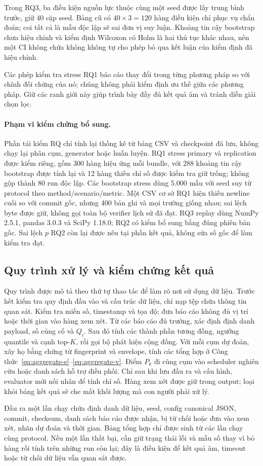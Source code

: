 Trong RQ3, ba điều kiện nguồn lực thuộc cùng một seed được lấy trung bình trước, giữ 40 cặp seed. Bảng cũ có $40\times3=120$ hàng điều kiện chỉ phục vụ chẩn đoán; coi tất cả là mẫu độc lập sẽ sai đơn vị suy luận. Khoảng tin cậy bootstrap chưa hiệu chỉnh và kiểm định Wilcoxon có Holm là hai thủ tục khác nhau, nên một CI không chứa không không tự cho phép bỏ qua kết luận của kiểm định đã hiệu chỉnh.

Các phép kiểm tra stress RQ1 báo cáo thay đổi trong từng phương pháp so với chính đối chứng của nó; chúng không phải kiểm định ưu thế giữa các phương pháp. Giữ các ranh giới này giúp trình bày đầy đủ kết quả âm và tránh diễn giải chọn lọc.

\paragraph{Phạm vi kiểm chứng bổ sung.} Phần tái kiểm RQ chỉ tính lại thống kê từ bảng CSV và checkpoint đã lưu, không chạy lại phân cụm, generator hoặc huấn luyện. RQ1 stress primary và replication được kiểm riêng, gồm 300 hàng hiệu ứng mỗi bundle, với 288 khoảng tin cậy bootstrap được tính lại và 12 hàng thiếu chỉ số được kiểm tra giữ trống; không gộp thành 80 run độc lập. Các bootstrap stress dùng 5.000 mẫu với seed suy từ protocol theo method/scenario/metric. Một CSV cơ sở RQ1 hiện thiếu newline cuối so với commit gốc, nhưng 400 bản ghi và mọi trường giống nhau; sai lệch byte được giữ, không gọi toàn bộ verifier lịch sử đã đạt. RQ3 replay dùng NumPy 2.5.1, pandas 3.0.3 và SciPy 1.18.0; RQ2 có kiểm bổ sung bằng đúng phiên bản gốc. Sai lệch $p$ RQ2 còn lại được nêu tại phần kết quả, không sửa số gốc để làm kiểm tra đạt.

\subsection{Quy trình xử lý và kiểm chứng kết quả}\label{sec:02-reproducibility}
Quy trình được mô tả theo thứ tự thao tác để làm rõ nơi sử dụng dữ liệu. Trước hết kiểm tra quy định đầu vào và cấu trúc dữ liệu, chỉ nạp tệp chứa thông tin quan sát. Kiểm tra miền số, timestamp và tọa độ; đưa báo cáo không đủ vị trí hoặc thời gian vào hàng xem xét. Từ các báo cáo đủ trường, xác định định danh payload, số củng cố và $Q_i$. Sau đó tính các thành phần tương đồng, ngưỡng quantile và cạnh top-$K$, rồi gọi bộ phát hiện cộng đồng. Với mỗi cụm dự đoán, xây họ bằng chứng từ fingerprint và envelope, tính các tổng hợp ở Công thức~\ref{eq:aggregate-e}--\ref{eq:aggregate-v}. Điểm $P_k$ đi cùng cụm vào scheduler nghiên cứu hoặc danh sách hỗ trợ điều phối. Chỉ sau khi lưu đầu ra và cấu hình, evaluator mới nối nhãn để tính chỉ số. Hàng xem xét được giữ trong output; loại khỏi bảng kết quả sẽ che mất khối lượng mà con người phải xử lý.

Đầu ra một lần chạy chứa định danh dữ liệu, seed, config canonical JSON, commit, checksum, danh sách báo cáo được nhận, bị từ chối hoặc đưa vào xem xét, nhãn dự đoán và thời gian. Bảng tổng hợp chỉ được sinh từ các lần chạy cùng protocol. Nếu một lần thất bại, cần giữ trạng thái lỗi và mẫu số thay vì bỏ hàng rồi tính trên những run còn lại; đây là điều kiện để kết quả âm, timeout hoặc từ chối dữ liệu vẫn quan sát được.
